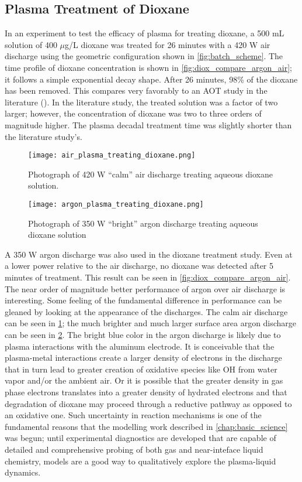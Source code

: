 \subsection{Plasma Treatment of Dioxane}
\label{sec:dioxane}

In an experiment to test the efficacy of plasma for treating dioxane, a 500 mL solution of 400 $\mu$g/L dioxane was treated for 26 minutes with a 420 W air discharge using the geometric configuration shown in \cref{fig:batch_scheme}. The time profile of dioxane concentration is shown in \cref{fig:diox_compare_argon_air}; it follows a simple exponential decay shape. After 26 minutes, 98\% of the dioxane has been removed. This compares very favorably to an AOT study in the literature (\cite{suh2004study}). In the literature study, the treated solution was a factor of two larger; however, the concentration of dioxane was two to three orders of magnitude higher. The plasma decadal treatment time was slightly shorter than the literature study's.

\begin{figure}[htbp]
  \centering
  \texttt{[image: air\_plasma\_treating\_dioxane.png]}
  \caption{Photograph of 420 W ``calm'' air discharge treating aqueous dioxane solution.}
  \label{fig:diox_air}
\end{figure}

\begin{figure}[htbp]
  \centering
  \texttt{[image: argon\_plasma\_treating\_dioxane.png]}
  \caption{Photograph of 350 W ``bright'' argon discharge treating aqueous dioxane solution}
  \label{fig:diox_argon}
\end{figure}

A 350 W argon discharge was also used in the dioxane treatment study. Even at a lower power relative to the air discharge, no dioxane was detected after 5 minutes of treatment. This result can be seen in \cref{fig:diox_compare_argon_air}. The near order of magnitude better performance of argon over air discharge is interesting. Some feeling of the fundamental difference in performance can be gleaned by looking at the appearance of the discharges. The calm air discharge can be seen in \cref{fig:diox_air}; the much brighter and much larger surface area argon discharge can be seen in \cref{fig:diox_argon}. The bright blue color in the argon discharge is likely due to plasma interactions with the aluminum electrode. It is conceivable that the plasma-metal interactions create a larger density of electrons in the discharge that in turn lead to greater creation of oxidative species like OH from water vapor and/or the ambient air. Or it is possible that the greater density in gas phase electrons translates into a greater density of hydrated electrons and that degradation of dioxane may proceed through a reductive pathway as opposed to an oxidative one. Such uncertainty in reaction mechanisms is one of the fundamental reasons that the modelling work described in \cref{chap:basic_science} was begun; until experimental diagnostics are developed that are capable of detailed and comprehensive probing of both gas and near-inteface liquid chemistry, models are a good way to qualitatively explore the plasma-liquid dynamics.

